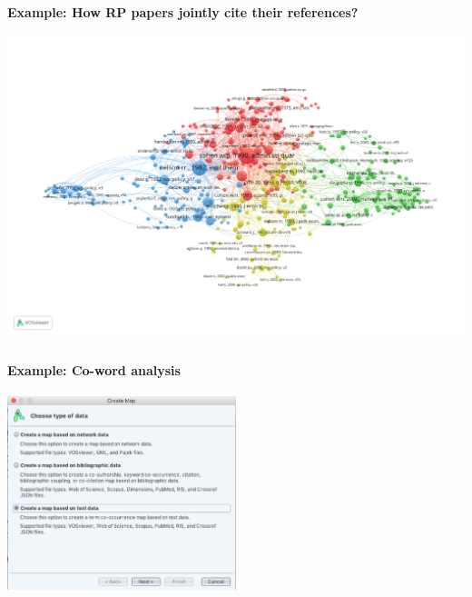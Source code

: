 \documentclass[8pt]{beamer}
\begin{document}
\begin{frame}
\frametitle{\insertsection}
\framesubtitle{Example: How RP papers jointly cite their references?}

\centering
\includegraphics[height = 0.9\textheight]{RP_20082018_jointly_cited_references}

\end{frame}


\begin{frame}
\frametitle{\insertsection}
\framesubtitle{Example: Co-word analysis}

\centering
\includegraphics[width= 0.5\textwidth]{voscoword}

\end{frame}

\end{document}

